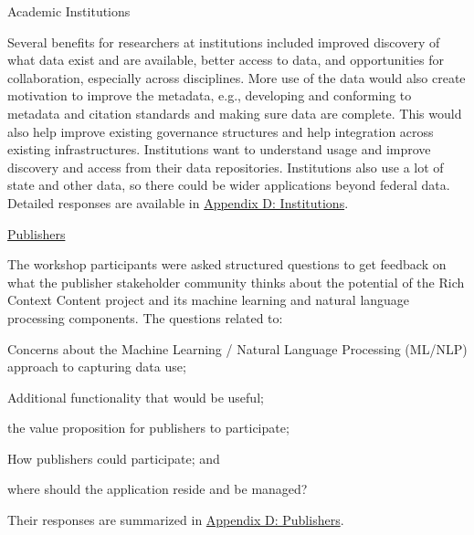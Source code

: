 \documentclass[titlepage, 11pt]{article}
\begin{document}
{Academic Institutions

Several benefits for researchers at institutions included improved discovery of what data exist and are available, better access to data, and opportunities for collaboration, especially across disciplines.  More use of the data would also create motivation to improve the metadata, e.g., developing and conforming to metadata and citation standards and making sure data are complete. This would also help improve existing governance structures and help integration across existing infrastructures.  Institutions want to understand usage and improve discovery and access from their data repositories. Institutions also use a lot of state and other data, so there could be wider applications beyond federal data. Detailed responses are available in \hyperref[subsec:Academicinstitutions]{Appendix D: Institutions}.

\href{https://coleridgeinitiative.org/show-us-the-data/stakeholder-questions/#publishers}{Publishers}



The workshop participants were asked structured questions to get feedback on what the publisher stakeholder community thinks about the potential of the Rich Context Content project and its machine learning and natural language processing components. The questions related to: \begin{enumerate*}[label=(\arabic*)]
    \item Concerns about the Machine Learning / Natural Language Processing (ML/NLP) approach to capturing data use; 
    \item Additional functionality that would be useful;
    \item the value proposition for publishers to participate;
    \item How publishers could participate; and
    \item where should the application reside and be managed?
\end{enumerate*} Their responses are summarized in \hyperref[subsec:publishers]{Appendix D: Publishers}.

}
\end{document}
